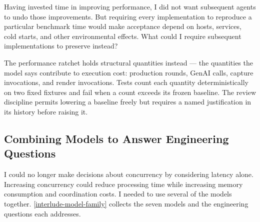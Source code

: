 Having invested time in improving performance, I did not want subsequent agents to undo those improvements. But requiring every implementation to reproduce a particular benchmark time would make acceptance depend on hosts, services, cold starts, and other environmental effects. What could I require subsequent implementations to preserve instead?

The performance ratchet holds structural quantities instead --- the quantities the model says contribute to execution cost: production rounds, GenAI calls, capture invocations, and render invocations. Tests count each quantity deterministically on two fixed fixtures and fail when a count exceeds its frozen baseline. The review discipline permits lowering a baseline freely but requires a named justification in its history before raising it.


\subsection{Combining Models to Answer Engineering Questions}\label{heading:the-resulting-model-family}

I could no longer make decisions about concurrency by considering latency alone. Increasing concurrency could reduce processing time while increasing memory consumption and coordination costs. I needed to use several of the models together. \autoref{interlude-model-family} collects the seven models and the engineering questions each addresses.

